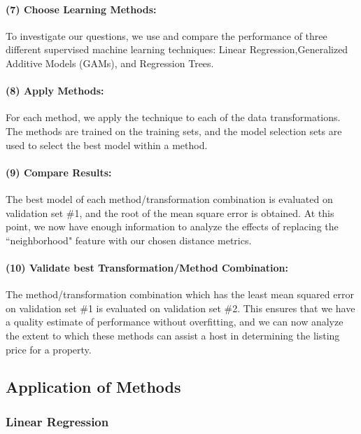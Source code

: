 \documentclass[11pt]{article}
\begin{document}
             
             \paragraph{(7) Choose Learning Methods:}
             	To investigate our questions, we use and compare the performance of three different supervised machine learning techniques: Linear Regression,Generalized Additive Models (GAMs), and Regression Trees.
             
             
             \paragraph{(8) Apply Methods:}
             	For each method, we apply the technique to each of the data transformations. The methods are trained on the training sets, and the model selection sets are used to select the best model within a method.
             
             \paragraph{(9) Compare Results:}
             	The best model of each method/transformation combination is evaluated on validation set \#1, and the root of the mean square error is obtained. At this point, we now have enough information to analyze the effects of replacing the ``neighborhood" feature with our chosen distance metrics.
               
             \paragraph{(10) Validate best Transformation/Method Combination:}
             	The method/transformation combination which has the least mean squared error on validation set \#1 is evaluated on validation set \#2. This ensures that we have a quality estimate of performance without overfitting, and we can now analyze the extent to which these methods can assist a host in determining the listing price for a property.


    	\subsection{Application of Methods}
            \subsubsection{Linear Regression}
\end{document}
